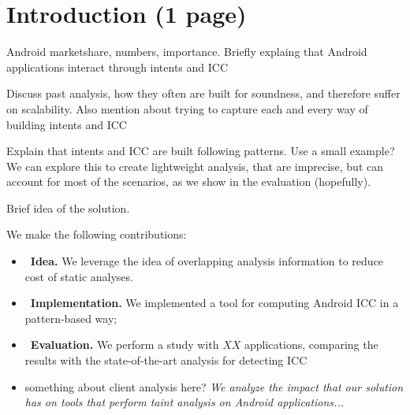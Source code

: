 \section{Introduction (1 page)}

Android marketshare, numbers, importance. 
Briefly explaing that Android applications interact through intents and ICC

Discuss past analysis, how they often are built for soundness, and therefore suffer on scalability. Also mention about trying to capture each and every way of building intents and ICC

Explain that intents and ICC are built following patterns. Use a small
example? We can explore this to create lightweight analysis, that are imprecise, but can account for most of the scenarios, as we show in the evaluation (hopefully). 

Brief idea of the solution. 

We make the following contributions:
\begin{itemize}
 \item~\textbf{Idea.} We leverage the idea of overlapping analysis information to
   reduce cost of static analyses.
 \item~\textbf{Implementation.} We implemented a tool for computing Android ICC in a
   pattern-based way;
 \item~\textbf{Evaluation.} We perform a study with $XX$ applications, comparing the results with the state-of-the-art analysis for detecting ICC~\cite{epicc,iccta,comdroid}
 \item something about client analysis here? \emph{We analyze the
   impact that our solution has on tools that perform taint analysis
   on Android applications...}
\end{itemize}



